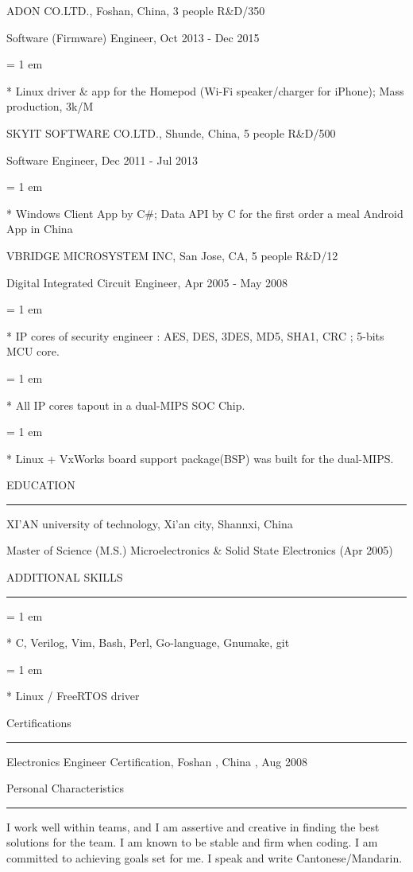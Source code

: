 { \medbreak } { \FFbg
ADON CO.LTD., Foshan, China, 3 people R\&D/350
}

{ \FFte
Software (Firmware) Engineer, Oct 2013 - Dec 2015
}
{ \parindent = 1 em \item{*}
 Linux driver \& app for the Homepod (Wi-Fi speaker/charger for iPhone); Mass production, 3k/M
 }

{ \medbreak } { \FFbg
SKYIT SOFTWARE CO.LTD., Shunde, China, 5 people R\&D/500
}

{ \FFte
Software Engineer, Dec 2011 - Jul 2013
}
{ \parindent = 1 em \item{*}
 Windows Client App by C\#; Data API by C for the first order a meal Android App in China
 }

{ \medbreak } { \FFbg
VBRIDGE MICROSYSTEM INC, San Jose, CA, 5 people R\&D/12
}

{ \FFte
Digital Integrated Circuit Engineer, Apr 2005 - May 2008
}
{ \parindent = 1 em \item{*}
 IP cores of security engineer :
 AES, DES, 3DES, MD5, SHA1, CRC ;
 5-bits MCU core.
 }
{ \parindent = 1 em \item{*}
All IP cores tapout in a dual-MIPS SOC Chip.
 }
{ \parindent = 1 em \item{*}
Linux + VxWorks board support package(BSP) was built for the dual-MIPS.
 }

{ \medbreak } { \FFbg
EDUCATION
}
{ \smallbreak } {\par\noindent\hrule} { \smallbreak }
XI'AN university of technology, Xi'an city, Shannxi, China

{ \FFte
Master of Science (M.S.) Microelectronics \& Solid State Electronics (Apr 2005)
}

{ \medbreak } { \FFbg
ADDITIONAL SKILLS
}
{ \smallbreak } {\par\noindent\hrule} { \smallbreak }
{ \parindent = 1 em \item{*}
 C, Verilog, Vim, Bash, Perl, Go-language, Gnumake, git
 }
{ \parindent = 1 em \item{*}
 Linux / FreeRTOS driver
 }

{ \medbreak } { \FFbg
Certifications
}
{ \smallbreak } {\par\noindent\hrule} { \smallbreak }
Electronics Engineer Certification, Foshan , China , Aug 2008

{ \medbreak } { \FFbg
Personal Characteristics
}
{ \smallbreak } {\par\noindent\hrule} { \smallbreak }
I work well within teams, and I am assertive and creative
    in finding the best solutions for the team.
I am known to be stable and firm when coding.
I am committed to achieving goals set for me.
I speak and write
Cantonese/Mandarin.

